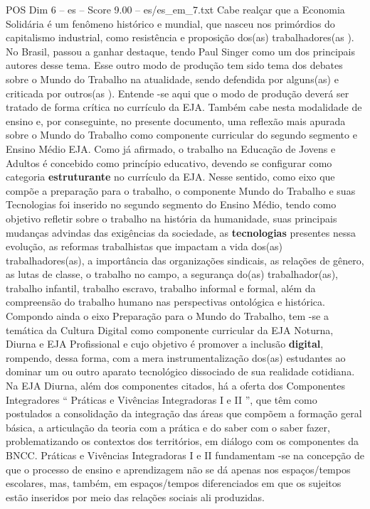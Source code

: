 \begin{textsample}{POS Dim 6 – es – Score 9.00 – es/es\_em\_7.txt}
Cabe realçar que a Economia Solidária é um fenômeno histórico e mundial, que nasceu nos primórdios do capitalismo industrial, como resistência e proposição dos(as) trabalhadores(as ).
No Brasil, passou a ganhar destaque, tendo Paul Singer como um dos principais autores desse tema.
Esse outro modo de produção tem sido tema dos debates sobre o Mundo do Trabalho na atualidade, sendo defendida por alguns(as) e criticada por outros(as ).
Entende -se aqui que o modo de produção deverá ser tratado de forma crítica no currículo da EJA.
Também cabe nesta modalidade de ensino e, por conseguinte, no presente documento, uma reflexão mais apurada sobre o Mundo do Trabalho como componente curricular do segundo segmento e Ensino Médio EJA.
Como já afirmado, o trabalho na Educação de Jovens e Adultos é concebido como princípio educativo, devendo se configurar como categoria \textbf{estruturante} no currículo da EJA.
Nesse sentido, como eixo que compõe a preparação para o trabalho, o componente Mundo do Trabalho e suas Tecnologias foi inserido no segundo segmento do Ensino Médio, tendo como objetivo refletir sobre o trabalho na história da humanidade, suas principais mudanças advindas das exigências da sociedade, as \textbf{tecnologias} presentes nessa evolução, as reformas trabalhistas que impactam a vida dos(as) trabalhadores(as), a importância das organizações sindicais, as relações de gênero, as lutas de classe, o trabalho no campo, a segurança do(as) trabalhador(as), trabalho infantil, trabalho escravo, trabalho informal e formal, além da compreensão do trabalho humano nas perspectivas ontológica e histórica.
Compondo ainda o eixo Preparação para o Mundo do Trabalho, tem -se a temática da Cultura Digital como componente curricular da EJA Noturna, Diurna e EJA Profissional e cujo objetivo é promover a inclusão \textbf{digital}, rompendo, dessa forma, com a mera instrumentalização dos(as) estudantes ao dominar um ou outro aparato tecnológico dissociado de sua realidade cotidiana.
Na EJA Diurna, além dos componentes citados, há a oferta dos Componentes Integradores “ Práticas e Vivências Integradoras I e II ”, que têm como postulados a consolidação da integração das áreas que compõem a formação geral básica, a articulação da teoria com a prática e do saber com o saber fazer, problematizando os contextos dos territórios, em diálogo com os componentes da BNCC.
Práticas e Vivências Integradoras I e II fundamentam -se na concepção de que o processo de ensino e aprendizagem não se dá apenas nos espaços/tempos escolares, mas, também, em espaços/tempos diferenciados em que os sujeitos estão inseridos por meio das relações sociais ali produzidas.

\end{textsample}
